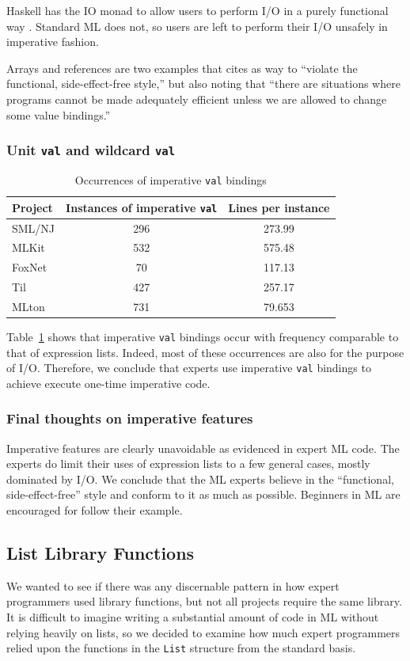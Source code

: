 \documentclass[12pt,abstracton]{scrartcl}
\begin{document}
Haskell has the IO monad to allow users to perform I/O in a purely functional way \cite{Jon93}.
Standard ML does not, so users are left to perform their
I/O unsafely in imperative fashion.

Arrays and references are two examples that \cite{Ull98} cites as way to ``violate the functional,
side-effect-free style,'' but also noting that ``there are situations where programs cannot
be made adequately efficient unless we are allowed to change some value bindings.''
\subsubsection{Unit \texttt{val} and wildcard \texttt{val}}
\begin{table}[h!]
\centering
\begin{tabular}{|l||c|c|}
\hline
Project & Instances of imperative \texttt{val} & Lines per instance \\ \hline\hline
SML/NJ & 296 & 273.99 \\
MLKit & 532 & 575.48 \\
FoxNet & 70 & 117.13 \\
Til & 427 & 257.17 \\
MLton & 731 & 79.653 \\ \hline
\end{tabular}
\caption{Occurrences of imperative \texttt{val} bindings}
\label{table:val}
\end{table}

Table~\ref{table:val} shows that imperative \texttt{val} bindings
occur with frequency comparable to that of expression lists.
Indeed, most of these occurrences are also for the purpose of I/O.
Therefore, we conclude that experts use imperative \texttt{val} bindings
to achieve execute one-time imperative code.
\subsubsection{Final thoughts on imperative features}
Imperative features are clearly unavoidable as evidenced in expert ML code. The experts do
limit their uses of expression lists to a few general cases, mostly dominated by I/O.
We conclude that the ML experts believe in the ``functional, side-effect-free'' style
and conform to it as much as possible. Beginners in ML are encouraged for follow their example.
\subsection{List Library Functions}\label{subsec:list}
We wanted to see if there was any discernable pattern in how expert programmers
used library functions, but not all projects require the same library.
It is difficult to imagine writing a substantial amount of code in ML without
relying heavily on lists, so we decided to examine how much expert programmers relied upon the functions
in the \texttt{List} structure from the standard basis.
\end{document}
